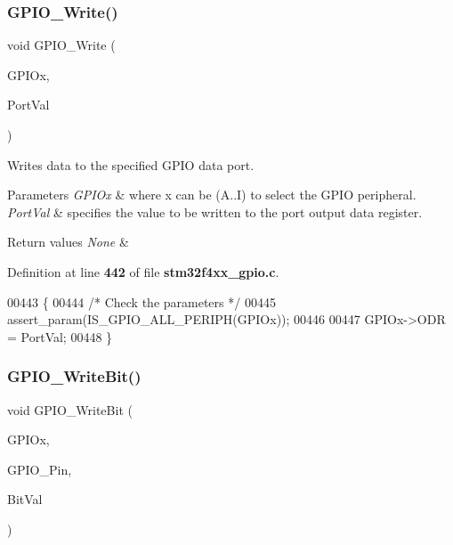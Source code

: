 \subsubsection{G\+P\+I\+O\+\_\+\+Write()}
{\footnotesize\ttfamily void G\+P\+I\+O\+\_\+\+Write (\begin{DoxyParamCaption}\item[{\textbf{ G\+P\+I\+O\+\_\+\+Type\+Def} $\ast$}]{G\+P\+I\+Ox,  }\item[{uint16\+\_\+t}]{Port\+Val }\end{DoxyParamCaption})}



Writes data to the specified G\+P\+IO data port. 


\begin{DoxyParams}{Parameters}
{\em G\+P\+I\+Ox} & where x can be (A..I) to select the G\+P\+IO peripheral. \\
\hline
{\em Port\+Val} & specifies the value to be written to the port output data register. \\
\hline
\end{DoxyParams}

\begin{DoxyRetVals}{Return values}
{\em None} & \\
\hline
\end{DoxyRetVals}


Definition at line \textbf{ 442} of file \textbf{ stm32f4xx\+\_\+gpio.\+c}.


\begin{DoxyCode}
00443 \{
00444   \textcolor{comment}{/* Check the parameters */}
00445   assert_param(IS_GPIO_ALL_PERIPH(GPIOx));
00446 
00447   GPIOx->ODR = PortVal;
00448 \}
\end{DoxyCode}
\mbox{\label{group__GPIO__Group2_ga8f7b237fd744d9f7456fbe0da47a9b80}} 
\subsubsection{G\+P\+I\+O\+\_\+\+Write\+Bit()}
{\footnotesize\ttfamily void G\+P\+I\+O\+\_\+\+Write\+Bit (\begin{DoxyParamCaption}\item[{\textbf{ G\+P\+I\+O\+\_\+\+Type\+Def} $\ast$}]{G\+P\+I\+Ox,  }\item[{uint16\+\_\+t}]{G\+P\+I\+O\+\_\+\+Pin,  }\item[{\textbf{ Bit\+Action}}]{Bit\+Val }\end{DoxyParamCaption})}



